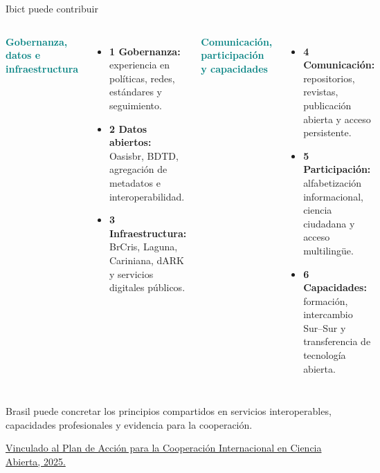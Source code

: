 \documentclass[aspectratio=169,11pt]{beamer}
\newcommand{\tagline}[1]{\textcolor{Teal}{\bfseries\small#1}}
\begin{document}
\begin{frame}{Ibict puede contribuir}
  \small
  \begin{columns}[T,onlytextwidth]
      \tagline{Gobernanza, datos e infraestructura}
      \vspace{0.18cm}
      \begin{itemize}\setlength\itemsep{0.25cm}
        \item \textbf{1 \; Gobernanza:} experiencia en políticas, redes, estándares y seguimiento.
        \item \textbf{2 \; Datos abiertos:} Oasisbr, BDTD, agregación de metadatos e interoperabilidad.
        \item \textbf{3 \; Infraestructura:} BrCris, Laguna, Cariniana, dARK y servicios digitales públicos.
      \end{itemize}
      \tagline{Comunicación, participación y capacidades}
      \vspace{0.18cm}
      \begin{itemize}\setlength\itemsep{0.25cm}
        \item \textbf{4 \; Comunicación:} repositorios, revistas, publicación abierta y acceso persistente.
        \item \textbf{5 \; Participación:} alfabetización informacional, ciencia ciudadana y acceso multilingüe.
        \item \textbf{6 \; Capacidades:} formación, intercambio Sur--Sur y transferencia de tecnología abierta.
      \end{itemize}
  \end{columns}
  \vfill
  \begin{center}
    \colorbox{Mist}{\parbox{.90\linewidth}{\centering\small Brasil puede concretar los principios compartidos en servicios interoperables, capacidades profesionales y evidencia para la cooperación.}}

    \vspace{0.08cm}
    {\tiny\color{Muted}\href{https://en.most.gov.cn/pressroom/202512/t20251219_195559.html}{Vinculado al Plan de Acción para la Cooperación Internacional en Ciencia Abierta, 2025.}}
  \end{center}
\end{frame}
\end{document}
